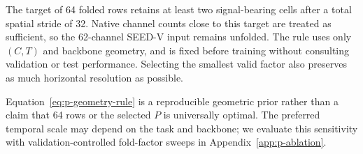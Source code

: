 The target of 64 folded rows retains at least two signal-bearing cells after a
total spatial stride of 32. Native channel counts close to this target are
treated as sufficient, so the 62-channel SEED-V input remains unfolded. The
rule uses only $(C,T)$ and backbone geometry, and is fixed before training
without consulting validation or test performance. Selecting the smallest
valid factor also preserves as much horizontal resolution as possible.

Equation~\ref{eq:p-geometry-rule} is a reproducible geometric prior rather
than a claim that 64 rows or the selected $P$ is universally optimal. The
preferred temporal scale may depend on the task and backbone; we evaluate this
sensitivity with validation-controlled fold-factor sweeps in
Appendix~\ref{app:p-ablation}.
